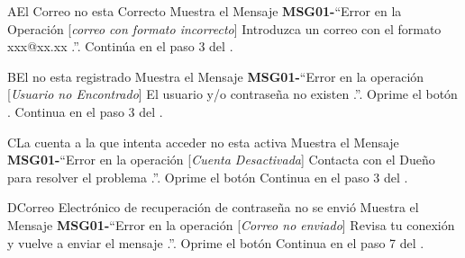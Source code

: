 	\begin{UCtrayectoriaA}{A}{El Correo no esta Correcto}
			\UCpaso Muestra el Mensaje {\bf MSG01-}``Error en la Operación [{\em correo con formato incorrecto}] Introduzca un correo con el formato xxx@xx.xx .''.
			\UCpaso Continúa en el paso 3 del .
		\end{UCtrayectoriaA}
		\begin{UCtrayectoriaA}{B}{El \UCactor no esta registrado}
			\UCpaso Muestra el Mensaje {\bf MSG01-}``Error en la operación [{\em Usuario no Encontrado}] El usuario y/o contraseña no existen .''.
			\UCpaso[\UCactor] Oprime el botón .
			\UCpaso[] Continua en el paso 3 del .
		\end{UCtrayectoriaA}		
		\begin{UCtrayectoriaA}{C}{La cuenta a la que intenta acceder no esta activa}
			\UCpaso Muestra el Mensaje {\bf MSG01-}``Error en la operación [{\em Cuenta Desactivada}] Contacta con el Dueño para resolver el problema .''.
			\UCpaso[\UCactor] Oprime el botón 
			\UCpaso Continua en el paso 3 del .
		\end{UCtrayectoriaA}
	\begin{UCtrayectoriaA}{D}{Correo Electrónico de recuperación de contraseña no se envió}
			\UCpaso Muestra el Mensaje {\bf MSG01-}``Error en la operación [{\em Correo no enviado}] Revisa tu conexión y vuelve a enviar el mensaje .''.
			\UCpaso[\UCactor] Oprime el botón 
			\UCpaso Continua en el paso 7 del .
		\end{UCtrayectoriaA}


		
